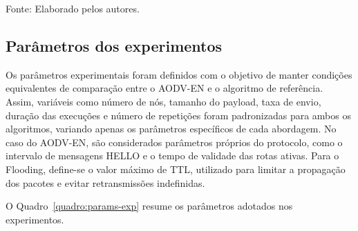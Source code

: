 Fonte: Elaborado pelos autores.

\subsection{Parâmetros dos
experimentos}\label{paruxe2metros-dos-experimentos}

Os parâmetros experimentais foram definidos com o objetivo de manter
condições equivalentes de comparação entre o AODV-EN e o algoritmo de
referência. Assim, variáveis como número de nós, tamanho do payload,
taxa de envio, duração das execuções e número de repetições foram
padronizadas para ambos os algoritmos, variando apenas os parâmetros
específicos de cada abordagem. No caso do AODV-EN, são considerados
parâmetros próprios do protocolo, como o intervalo de mensagens HELLO e
o tempo de validade das rotas ativas. Para o Flooding, define-se o valor
máximo de TTL, utilizado para limitar a propagação dos pacotes e evitar
retransmissões indefinidas.

O Quadro~\ref{quadro:params-exp} resume os parâmetros adotados nos experimentos.

